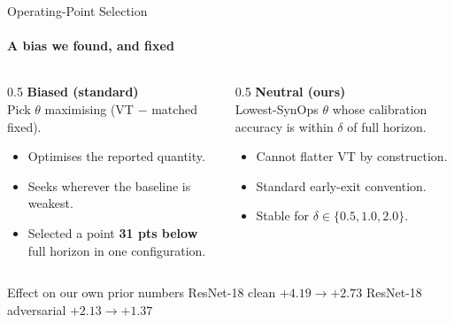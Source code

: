 \documentclass[aspectratio=169,11pt]{beamer}
\newcommand{\ATK}[1]{\textcolor{catk}{#1}}
\begin{document}
\begin{frame}{Operating-Point Selection}\framesubtitle{A bias we found, and fixed}
\begin{columns}[T]
\begin{column}{0.5\textwidth}
\textbf{\ATK{Biased (standard)}}\\
\vspace{3mm}
Pick $\theta$ maximising (VT $-$ matched fixed).
\begin{itemize}\small
  \item Optimises the reported quantity.
  \item Seeks wherever the baseline is weakest.
  \item Selected a point \textbf{31 pts below} full horizon in one configuration.
\end{itemize}
\end{column}
\begin{column}{0.5\textwidth}
\textbf{Neutral (ours)}\\
\vspace{3mm}
Lowest-SynOps $\theta$ whose calibration accuracy is within $\delta$ of full horizon.
\begin{itemize}\small
  \item Cannot flatter VT by construction.
  \item Standard early-exit convention.
  \item Stable for $\delta \in \{0.5, 1.0, 2.0\}$.
\end{itemize}
\end{column}
\end{columns}
\vspace{0.5em}
\begin{block}{Effect on our own prior numbers}
\small ResNet-18 clean $+4.19 \rightarrow \mathbf{+2.73}$ \qquad
ResNet-18 adversarial $+2.13 \rightarrow \mathbf{+1.37}$
\end{block}
\end{frame}
\end{document}
